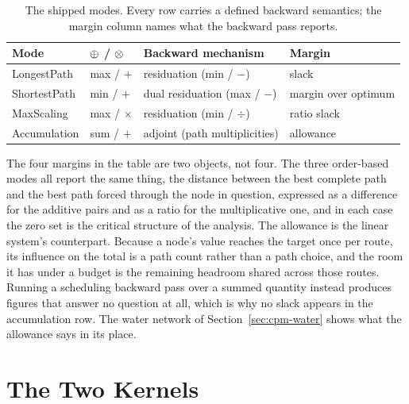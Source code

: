 \documentclass[12pt]{report}
\begin{document}
\begin{table}[htbp]
\centering
\caption{The shipped modes. Every row carries a defined backward semantics;
the margin column names what the backward pass reports.}
\label{tab:cpm-modes}
\small
\renewcommand{\arraystretch}{1.2}
\begin{tabular}{llll}
\toprule
Mode & $\oplus$ / $\otimes$ & Backward mechanism & Margin \\
\midrule
LongestPath & max / $+$ & residuation (min / $-$) & slack \\
ShortestPath & min / $+$ & dual residuation (max / $-$) & margin over optimum \\
MaxScaling & max / $\times$ & residuation (min / $\div$) & ratio slack \\
Accumulation & sum / $+$ & adjoint (path multiplicities) & allowance \\
\bottomrule
\end{tabular}
\end{table}

The four margins in the table are two objects, not four. The three
order-based modes all report the same thing, the distance between the best
complete path and the best path forced through the node in question,
expressed as a difference for the additive pairs and as a ratio for the
multiplicative one, and in each case the zero set is the critical structure
of the analysis. The allowance is the linear system's counterpart. Because a
node's value reaches the target once per route, its influence on the total
is a path count rather than a path choice, and the room it has under a
budget is the remaining headroom shared across those routes. Running a
scheduling backward pass over a summed quantity instead produces figures
that answer no question at all, which is why no slack appears in the
accumulation row. The water network of Section~\ref{sec:cpm-water} shows
what the allowance says in its place.

\section{The Two Kernels}
\label{sec:cpm-kernels}
\end{document}
